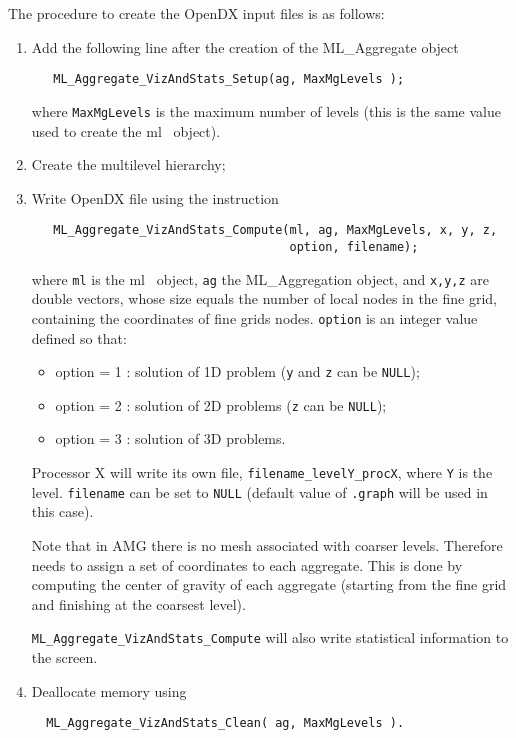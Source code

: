 \documentclass[10pt,letter,relax]{SANDreport}
\newcommand{\ML}     {{\sc ml }}
\begin{document}
The procedure to create the OpenDX input files is as follows:
\begin{enumerate}
\item Add the following line after the creation of the ML\_Aggregate object
\begin{verbatim}
   ML_Aggregate_VizAndStats_Setup(ag, MaxMgLevels );
\end{verbatim}
  where \verb!MaxMgLevels! is the maximum number of levels (this is the
  same value used to create the \ML\ object).
\item Create the multilevel hierarchy;
\item Write OpenDX file using the instruction
\begin{verbatim}
   ML_Aggregate_VizAndStats_Compute(ml, ag, MaxMgLevels, x, y, z,
                                    option, filename);
\end{verbatim}
   where \verb!ml! is the \ML\ object, \verb!ag! the ML\_Aggregation object, 
   and \verb!x,y,z! are double vectors, whose size
   equals the number of local nodes in the fine grid, containing the coordinates
   of fine grids nodes. \verb!option! is an integer value defined so
   that:
   \begin{itemize}
   \item option = 1 : solution of 1D problem ({\tt y} and {\tt z} can be
     {\tt NULL});
   \item option = 2 : solution of 2D problems ({\tt z} can be {\tt NULL});
   \item option = 3 : solution of 3D problems.
   \end{itemize}
   Processor X will write its own file, \verb!filename_levelY_procX!, where
   \verb!Y! is the level. \verb!filename! can be set to {\tt NULL} (default value of
   \verb!.graph! will be used in this case).
   
   Note that in AMG there is no mesh associated with coarser
   levels. Therefore  needs to
   assign a set of coordinates  to each aggregate.
   This is done by computing the center
   of gravity of each aggregate (starting from the fine grid and finishing
   at the coarsest level).

   \verb!ML_Aggregate_VizAndStats_Compute!
   will also write statistical
   information to the screen.

\item Deallocate memory using
\begin{verbatim}
  ML_Aggregate_VizAndStats_Clean( ag, MaxMgLevels ).
\end{verbatim}
\end{enumerate}
\end{document}
